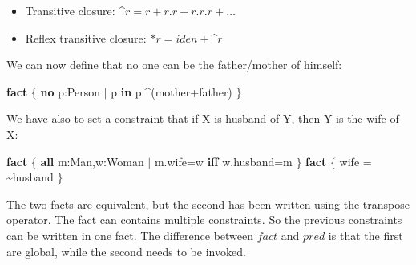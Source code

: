 \documentclass[12pt, a4paper]{report}
\newtheorem[style=M,bodystyle=\normalfont]{theorem}{Theorem}
\newtheorem[style=M,bodystyle=\normalfont]{corollary}{Corollary}
\newtheorem[style=M,bodystyle=\normalfont]{lemma}{Lemma}
\newtheorem[style=M,bodystyle=\normalfont]{definition}{Definition}
\begin{document}
        \begin{itemize}
            \item Transitive closure: \textasciicircum $r=r+r.r+r.r.r+\dots$
            \item Reflex transitive closure: $*r=iden+$\textasciicircum$r$
        \end{itemize}
        We can now define that no one can be the father/mother of himself: 
        \begin{algorithmic}[H]
            \State \textbf{fact} $\{$
            \State \:\:\:\:\:\:\:\: \textbf{no} p:Person $\mid$ p \textbf{in} p.\textasciicircum(mother+father)
            \State $\}$
        \end{algorithmic} 
        We have also to set a constraint that if X is husband of Y, then Y is the wife of X:
        \begin{algorithmic}[H]
            \State \textbf{fact} $\{$
            \State \:\:\:\:\:\:\:\: \textbf{all} m:Man,w:Woman $\mid$ m.wife=w \textbf{iff} w.husband=m
            \State $\}$
            \State \textbf{fact} $\{$
            \State \:\:\:\:\:\:\:\: wife = \textasciitilde husband
            \State $\}$
        \end{algorithmic} 
        The two facts are equivalent, but the second has been written using the transpose operator. The fact can contains multiple constraints. So the previous constraints can be written 
        in one fact. The difference between $fact$ and $pred$ is that the first are global, while the second needs to be invoked.
        
    \newpage




    

    
\end{document}
